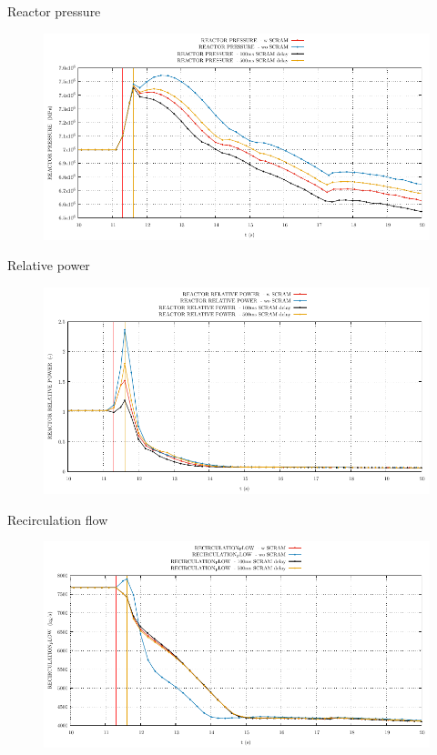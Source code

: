 \begin{frame}{Reactor pressure}
	\begin{figure}
		\centering
		\includegraphics[width=\textwidth]{./01PressureAccident/graphs/REACTOR PRESSURE _comp.pdf}
		
	\end{figure}
	
\end{frame}
%
%
%
\begin{frame}{Relative power}
	\begin{figure}
		\centering
		\includegraphics[width=\textwidth]{./01PressureAccident/graphs/REACTOR RELATIVE POWER _comp.pdf}
		
	\end{figure}
\end{frame}


%
\begin{frame}{Recirculation flow}
	\begin{figure}
		\centering
		\includegraphics[width=\textwidth]{./01PressureAccident/graphs/RECIRCULATION_FLOW _comp.pdf}
		
	\end{figure}
	
\end{frame}

